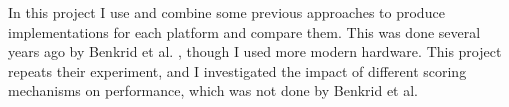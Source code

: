 In this project I use and combine some previous approaches to produce implementations for each platform and compare them.
This was done several years ago by Benkrid et al. \cite{Benkrid12}, though I used more modern hardware.
This project repeats their experiment, and I investigated the impact of different scoring mechanisms on performance, which was not done by Benkrid et al.
